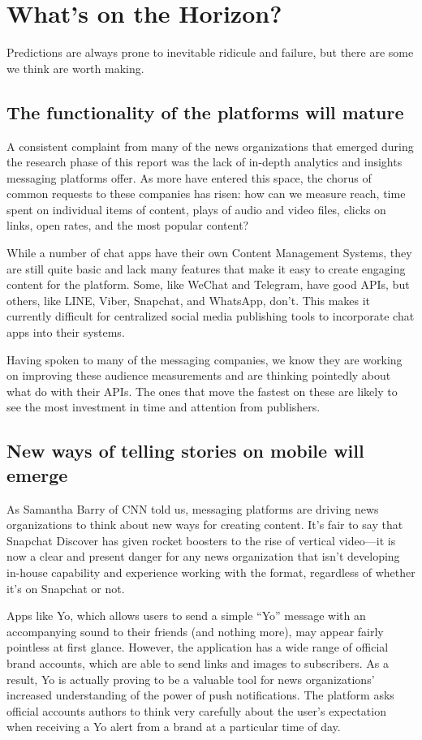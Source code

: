 \documentclass[notoc, symmetric, nobib, nols]{towcenter-guideto-book}
\begin{document}
\section{What's on the Horizon?}

Predictions are always prone to inevitable ridicule and failure, but there are some we think are worth making.

\subsection{The functionality of the platforms will mature}
A consistent complaint from many of the news organizations that emerged during the research phase of this report was the lack of in-depth analytics and insights messaging platforms offer. As more have entered this space, the chorus of common requests to these companies has risen: how can we measure reach, time spent on individual items of content, plays of audio and video files, clicks on links, open rates, and the most popular content?

While a number of chat apps have their own Content Management Systems, they are still quite basic and lack many features that make it easy to create engaging content for the platform. Some, like WeChat and Telegram, have good APIs, but others, like LINE, Viber, Snapchat, and WhatsApp, don't. This makes it currently difficult for centralized social media publishing tools to incorporate chat apps into their systems.

Having spoken to many of the messaging companies, we know they are working on improving these audience measurements and are thinking pointedly about what do with their APIs. The ones that move the fastest on these are likely to see the most investment in time and attention from publishers. 

\subsection{New ways of telling stories on mobile will emerge}
As Samantha Barry of CNN told us, messaging platforms are driving news organizations to think about new ways for creating content. It's fair to say that Snapchat Discover has given rocket boosters to the rise of vertical video---it is now a clear and present danger for any news organization that isn't developing in-house capability and experience working with the format, regardless of whether it's on Snapchat or not. 

Apps like Yo, which allows users to send a simple ``Yo'' message with an accompanying sound to their friends (and nothing more), may appear fairly pointless at first glance. However, the application has a wide range of official brand accounts, which are able to send links and images to subscribers. As a result, Yo is actually proving to be a valuable tool for news organizations' increased understanding of the power of push notifications. The platform asks official accounts authors to think very carefully about the user's expectation when receiving a Yo alert from a brand at a particular time of day.
\end{document}
